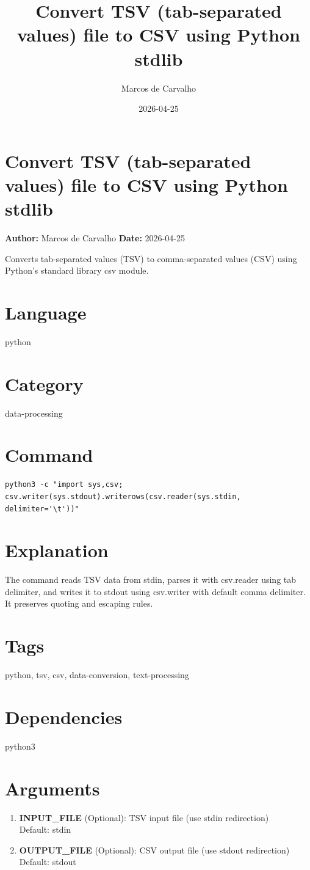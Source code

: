 \documentclass{article}
\title{Convert TSV (tab-separated values) file to CSV using Python stdlib}
\author{Marcos de Carvalho}
\date{2026-04-25}
\begin{document}
\section*{Convert TSV (tab-separated values) file to CSV using Python stdlib}
\textbf{Author:} Marcos de Carvalho \hfill \textbf{Date:} 2026-04-25

\noindent Converts tab-separated values (TSV) to comma-separated values (CSV) using Python's standard library csv module.

\section*{Language}
python

\section*{Category}
data-processing

\section*{Command}
\begin{lstlisting}
python3 -c "import sys,csv; csv.writer(sys.stdout).writerows(csv.reader(sys.stdin, delimiter='\t'))"
\end{lstlisting}

\section*{Explanation}
The command reads TSV data from stdin, parses it with csv.reader using tab delimiter, and writes it to stdout using csv.writer with default comma delimiter. It preserves quoting and escaping rules.

\section*{Tags}
python, tsv, csv, data-conversion, text-processing

\section*{Dependencies}
python3


\section*{Arguments}
\begin{enumerate}
  \item \textbf{INPUT\_FILE} (Optional): TSV input file (use stdin redirection) \\ Default: stdin
  \item \textbf{OUTPUT\_FILE} (Optional): CSV output file (use stdout redirection) \\ Default: stdout
\end{enumerate}
\end{document}
